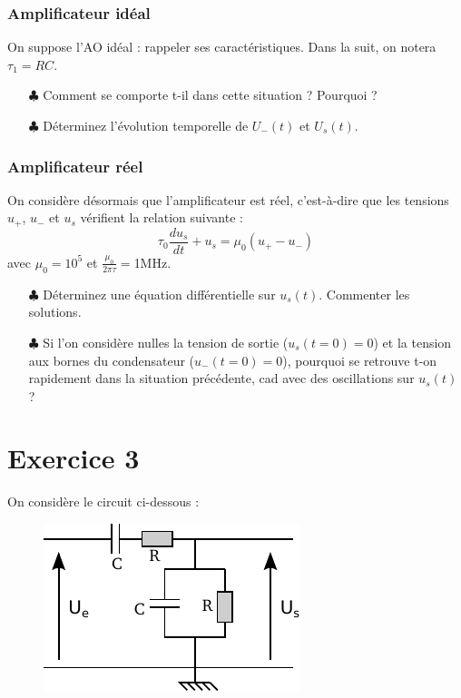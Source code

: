 \documentclass{report}
\begin{document}
\subsubsection{Amplificateur idéal}

On suppose l'AO idéal : rappeler ses caractéristiques. Dans la suit, on notera $\tau_1=RC$.

\begin{itemize}
	\item[$\clubsuit$] Comment se comporte t-il dans cette situation ? Pourquoi ?
	\item[$\clubsuit$] Déterminez l'évolution temporelle de  $U_{-}(t)$ et $U_{s}(t)$. 
\end{itemize}

\subsubsection{Amplificateur réel}

On considère désormais que l'amplificateur est réel, c'est-à-dire que les tensions $u_+$, $u_-$ et $u_s$ vérifient la relation suivante : 
	\begin{equation}
		\tau_0\frac{du_s}{dt} +u_s = \mu_0(u_+-u_-)
	\end{equation}
	avec $\mu_0=10^5$ et $\frac{\mu_0}{2\pi\tau}=$1MHz.
\begin{itemize}
	\item[$\clubsuit$] Déterminez une équation différentielle sur $u_s(t)$. Commenter les solutions. 
	\item[$\clubsuit$] Si l'on considère nulles la tension de sortie ($u_s(t=0)=0$) et la tension aux bornes du condensateur  ($u_-(t=0)=0$), pourquoi se retrouve t-on rapidement dans la situation précédente, cad avec des oscillations sur $u_s(t)$ ?
\end{itemize}


\newpage

\section*{Exercice 3}

On considère le circuit ci-dessous :

\begin{figure}[!h]
\centering
\includegraphics[width=0.5\linewidth]{circuit_1.pdf}
\end{figure}
\end{document}
